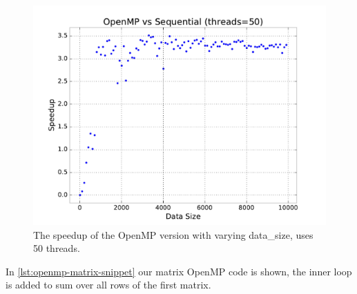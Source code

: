 \documentclass[final]{report}
\begin{document}
\begin{figure}[H]
\centering
    \includegraphics[width=\linewidth]{resources/openmp-data-size-sweep.pdf}
    \caption{The speedup of the OpenMP version with varying data\_size, uses 50 threads.}
    \label{fig:openmp-data-size-sweep}
\end{figure}

In \cref{lst:openmp-matrix-snippet} our matrix OpenMP code is shown, the inner loop is added to sum over all rows of the first matrix.
\end{document}
